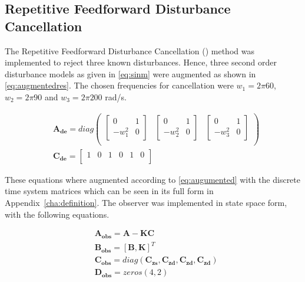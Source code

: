 \newpage
\FloatBarrier
\subsection{Repetitive Feedforward Disturbance Cancellation}
The Repetitive Feedforward Disturbance Cancellation (\abbrRFDC) method was implemented to reject three known disturbances. Hence, three second order disturbance models as given in \eqref{eq:sinm} were augmented as shown in \eqref{eq:augmentedres}. The chosen frequencies for cancellation were $w_1 = 2\pi60$, $w_2 = 2\pi90$ and $w_3 = 2\pi200$ rad/s.

\begin{subequations}
  \label{eq:augmentedres}
  \begin{alignat}{2}
    & \mathbf{A_{de}} = diag
    \begin{pmatrix}
      \begin{bmatrix}
         0 & 1\\[0.3em]
         -w_1^2 & 0
       \end{bmatrix}  &
       \begin{bmatrix}
          0 & 1\\[0.3em]
          -w_2^2 & 0
        \end{bmatrix} &
        \begin{bmatrix}
          0 & 1\\[0.3em]
          -w_3^2 & 0
        \end{bmatrix} \\
      \end{pmatrix} \\
    & \mathbf{C_{de}} =
        \begin{bmatrix}
            1 & 0 & 1 & 0 & 1 & 0 \\
        \end{bmatrix}
  \end{alignat}
\end{subequations}

These equations where augmented according to \eqref{eq:augumented} with the discrete time system matrices which can be seen in its full form in Appendix~\ref{cha:definition}. The observer was implemented in state space form, with the following equations.

\begin{subequations}
\label{eq:augmented}
  \begin{alignat}{2}
    & \mathbf{A_{obs}} = \mathbf{A - KC} \\
    & \mathbf{B_{obs}} = \mathbf{[B, K]}^T \\
    & \mathbf{C_{obs}} = diag(\mathbf{C_{zs}, C_{zd}, C_{zd}, C_{zd}}) \\
    & \mathbf{D_{obs}} = zeros(4,2)
  \end{alignat}
\end{subequations}


